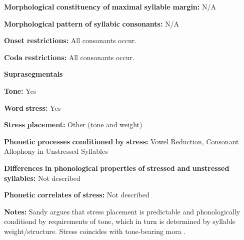 \documentclass[output=paper]{langsci/langscibook}
\begin{document}
\begin{styleBody}
\textbf{Morphological} \textbf{constituency} \textbf{of} \textbf{maximal} \textbf{syllable} \textbf{margin:} N/A
\end{styleBody}

\begin{styleBody}
\textbf{Morphological} \textbf{pattern} \textbf{of} \textbf{syllabic} \textbf{consonants:} N/A
\end{styleBody}

\begin{styleBody}
\textbf{Onset} \textbf{restrictions:} All consonants occur.
\end{styleBody}

\begin{styleBody}
\textbf{Coda} \textbf{restrictions:} All consonants occur.
\end{styleBody}

\begin{styleBody}
\textbf{Suprasegmentals}
\end{styleBody}

\begin{styleBody}
\textbf{Tone:} Yes
\end{styleBody}

\begin{styleBody}
\textbf{Word} \textbf{stress:} Yes
\end{styleBody}

\begin{styleBody}
\textbf{Stress} \textbf{placement:} Other (tone and weight)
\end{styleBody}

\begin{styleBody}
\textbf{Phonetic} \textbf{processes} \textbf{conditioned} \textbf{by} \textbf{stress:} Vowel Reduction, Consonant Allophony in Unstressed Syllables
\end{styleBody}

\begin{styleBody}
\textbf{Differences} \textbf{in} \textbf{phonological} \textbf{properties} \textbf{of} \textbf{stressed} \textbf{and} \textbf{unstressed} \textbf{syllables:} Not described
\end{styleBody}

\begin{styleBody}
\textbf{Phonetic} \textbf{correlates} \textbf{of} \textbf{stress:} Not described
\end{styleBody}

\begin{styleBody}
\textbf{Notes:} Sandy argues that stress placement is predictable and phonologically conditiond by requirements of tone, which in turn is determined by syllable weight/structure. Stress coincides with tone-bearing mora \citep[40]{Sandy2014}.
\end{styleBody}
\end{document}
